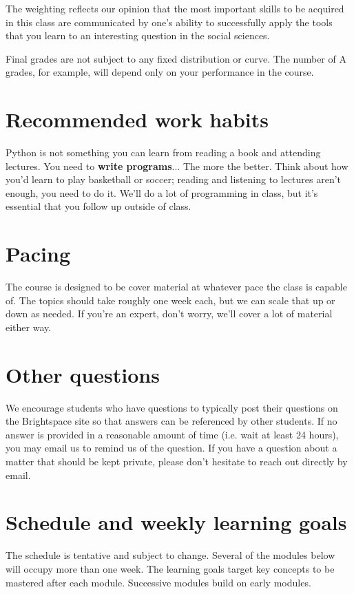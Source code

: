 \documentclass[12pt,pdftex,twoside,letterpaper]{exam}
\begin{document}
    The weighting reflects our opinion that the most important skills to be acquired in this class
    are communicated by one's ability to successfully apply the tools that you learn to an
    interesting question in the social sciences.

    Final grades are not subject to any fixed distribution or curve. The number of A grades, for
    example, will depend only on your performance in the course.

\section*{Recommended work habits}

  Python is not something you can learn from reading a book and attending lectures. You need to
  {\bf write programs}... The more the better. Think about how you'd learn to play basketball
  or soccer; reading and listening to lectures aren't enough, you need to do it. We'll do a lot of
  programming in class, but it's {essential} that you follow up outside of class.

\section*{Pacing}

  The course is designed to be cover material at whatever pace the class is capable of. The topics
  should take roughly one week each, but we can scale that up or down as needed. If you're an expert,
  don't worry, we'll cover a lot of material either way.

\section*{Other questions}

  We encourage students who have questions to typically post their questions on the Brightspace
  site so that answers can be referenced by other students. If no answer is provided in a reasonable
  amount of time (i.e. wait at least 24 hours), you may email us to remind us of the question. If you
  have a question about a matter that should be kept private, please don't hesitate to reach out
  directly by email.

  \newpage
\section*{Schedule and weekly learning goals}

  The schedule is tentative and subject to change. Several of the modules below will occupy more than one week.  The learning goals target
  key concepts to be mastered after each module. Successive modules build on early modules.
\end{document}
